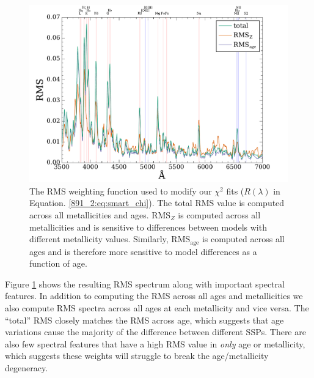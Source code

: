 
\begin{figure}
  \centering
  \includegraphics[width=\columnwidth]{891_2/figs/RMS_spec.pdf}
  \caption[RMS-based $\chi^2$ fitting
    weights]{\fixspacing\label{891_2:fig:RMS_spec}The RMS weighting
    function used to modify our $\chi^2$ fits ($R(\lambda)$ in
    Equation. \ref{891_2:eq:smart_chi}). The total RMS value is
    computed across all metallicities and ages. RMS$_Z$ is computed
    across all metallicities and is sensitive to differences between
    models with different metallicity values. Similarly,
    RMS$_\mathrm{age}$ is computed across all ages and is therefore
    more sensitive to model differences as a function of age.}
\end{figure}

Figure \ref{891_2:fig:RMS_spec} shows the resulting RMS spectrum along
with important spectral features. In addition to computing the RMS
across all ages and metallicities we also compute RMS spectra across
all ages at each metallicity and vice versa. The ``total'' RMS closely
matches the RMS across age, which suggests that age variations cause
the majority of the difference between different SSPs. There are also
few spectral features that have a high RMS value in \emph{only} age or
metallicity, which suggests these weights will struggle to break the
age/metallicity degeneracy.

